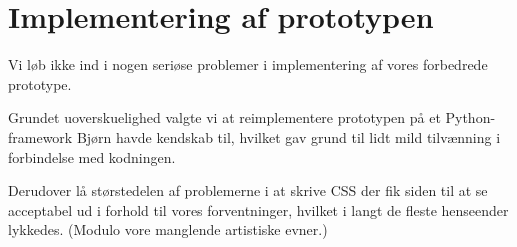 \section{Implementering af prototypen}

Vi løb ikke ind i nogen seriøse problemer i implementering af vores forbedrede prototype.

Grundet uoverskuelighed valgte vi at reimplementere prototypen på et Python-framework Bjørn havde kendskab til, hvilket gav grund til lidt mild tilvænning i forbindelse med kodningen.

Derudover lå størstedelen af problemerne i at skrive CSS der fik siden til at se acceptabel ud i forhold til vores forventninger, hvilket i langt de fleste henseender lykkedes. (Modulo vore manglende artistiske evner.)
